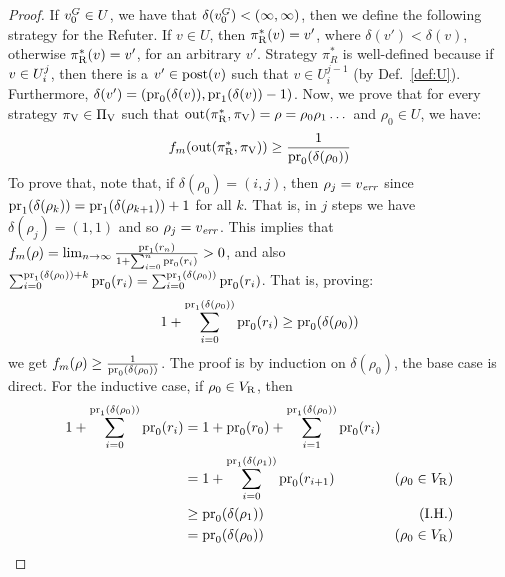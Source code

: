 \begin{proof}
	If $v_0^G \in U$, we have that $\delta(v_0^G) < (\infty, \infty)$, then we define the following strategy for the Refuter. 
	If $v \in U$, then $\pi^*_{\mathrm{R}}(v)= v'$, where $\delta(v') < \delta(v)$, otherwise $\pi^*_{\mathrm{R}}(v)=v'$, for an arbitrary $v'$. 
	Strategy $\pi^*_R$ is well-defined because if $v \in U^j_i$, then there is a $v' \in \operatorname{post}(v)$ such that $v \in U^{j-1}_i$ (by Def.~\ref{def:U}). Furthermore, $\delta(v') = (\operatorname{pr}_{0}(\delta(v)), \operatorname{pr}_{1}(\delta(v)) - 1)$.  
	Now, we prove that for every strategy $\pi_{\mathrm{V}} \in \Pi_{\mathrm{V}}$ such that $\operatorname{out}(\pi^*_{\mathrm{R}}, \pi_{\mathrm{V}}) = \rho = \rho_0 \rho_1 \dots$ and $\rho_0 \in U$, we have:
\begin{equation}\label{eq:inf-bound}
	f_{m}(\operatorname{out}(\pi^*_{\mathrm{R}}, \pi_{\mathrm{V}})) \geq \frac{1}{ \operatorname{pr}_{0}(\delta(\rho_0))}
\end{equation} 
		To prove that, note that, if $\delta(\rho_0)= (i,j)$, then $\rho_j =v_{\mathit{err}}$ 
		since $\operatorname{pr}_{1}(\delta(\rho_k)) = \operatorname{pr}_{1}(\delta(\rho_{k+1}))+1$ for all $k$. 
That is, in $j$ steps we have $\delta(\rho_{j}) = (1,1)$ and so $\rho_{j} = v_{\mathit{err}}$.
	This implies that $f_{m}(\rho) =  \lim_{n \rightarrow \infty}  \frac{\operatorname{pr}_{1}(r_n)}{1+ \sum^{n}_{i=0} \operatorname{pr}_{0}(r_i)} >0$, and also
$ \sum^{\operatorname{pr}_{1}(\delta(\rho_0)) + k}_{i=0} \operatorname{pr}_{0}(r_i) =  \sum^{\operatorname{pr}_{1}(\delta(\rho_0))}_{i=0} \operatorname{pr}_{0}(r_i)$.
	 That is, proving:
\begin{equation}\label{eq:bottom-sum}
 1+ \sum^{\operatorname{pr}_{1}(\delta(\rho_0))}_{i=0} \operatorname{pr}_{0}(r_i) \geq \operatorname{pr}_{0}(\delta(\rho_0))
\end{equation} 
we get $f_{m}(\rho) \geq \frac{1}{ \operatorname{pr}_{0}(\delta(\rho_0))}$. The proof is by induction on $\delta(\rho_0)$, the base case is direct.
 For the inductive case, if $\rho_0 \in V_{\mathrm{R}}$, then
\begin{align*}
 	1 + \sum^{\operatorname{pr}_{1}(\delta(\rho_0))}_{i=0} \operatorname{pr}_{0}(r_i) & =  1 + \operatorname{pr}_{0}(r_0) + \sum^{\operatorname{pr}_{1}(\delta(\rho_0))}_{i=1} \operatorname{pr}_{0}(r_i) & \\
					     & =   1+ \sum^{\operatorname{pr}_{1}(\delta(\rho_1))}_{i=0} \operatorname{pr}_{0}(r_{i+1}) &  \text{($\rho_0 \in V_{\mathrm{R}}$)}\\
					     & \geq \operatorname{pr}_{0}(\delta(\rho_1)) & \text{(I.H.)} \\
					     & = \operatorname{pr}_{0}(\delta(\rho_0)) & \text{($\rho_0 \in V_{\mathrm{R}}$)}
\end{align*}

\end{proof}
